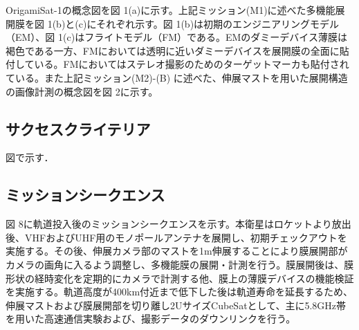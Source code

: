 OrigamiSat-1の概念図を図 1(a)に示す。上記ミッション(M1)に述べた多機能展開膜を図 1(b)と(c)にそれぞれ示す。図 1(b)は初期のエンジニアリングモデル（EM）、図 1(c)はフライトモデル（FM）である。EMのダミーデバイス薄膜は褐色である一方、FMにおいては透明に近いダミーデバイスを展開膜の全面に貼付している。FMにおいてはステレオ撮影のためのターゲットマーカも貼付されている。また上記ミッション(M2)-(B) に述べた、伸展マストを用いた展開構造の画像計測の概念図を図 2に示す。

\subsection{サクセスクライテリア}
図で示す．

\subsection{ミッションシークエンス}
図 8に軌道投入後のミッションシークエンスを示す。本衛星はロケットより放出後、VHFおよびUHF用のモノポールアンテナを展開し、初期チェックアウトを実施する。その後、伸展カメラ部のマストを1m伸展することにより膜展開部がカメラの画角に入るよう調整し、多機能膜の展開・計測を行う。膜展開後は、膜形状の経時変化を定期的にカメラで計測する他、膜上の薄膜デバイスの機能検証を実施する。軌道高度が400km付近まで低下した後は軌道寿命を延長するため、伸展マストおよび膜展開部を切り離し2UサイズCubeSatとして、主に5.8GHz帯を用いた高速通信実験および、撮影データのダウンリンクを行う。

